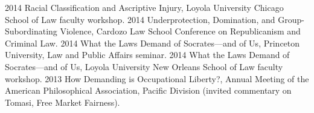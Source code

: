 \documentclass[letterpaper]{moderncv}
\begin{document}
\cvitem
{2014}
{Racial Classification and Ascriptive Injury, Loyola University Chicago School of Law faculty workshop.}
\vspace{1mm}
\cvitem
{2014}
{Underprotection, Domination, and Group-Subordinating Violence, Cardozo Law School Conference on Republicanism and Criminal Law.}
\vspace{1mm}
\cvitem
{2014}
{What the Laws Demand of Socrates---and of Us, Princeton University, Law and Public Affairs seminar.}
\vspace{1mm}
\cvitem
{2014}
{What the Laws Demand of Socrates---and of Us, Loyola University New Orleans School of Law faculty workshop.}
\vspace{1mm}
\cvitem
{2013}
{How Demanding is Occupational Liberty?, Annual Meeting of the American Philosophical Association, Pacific Division (invited commentary on Tomasi, Free Market Fairness).}
\vspace{1mm}
\end{document}

